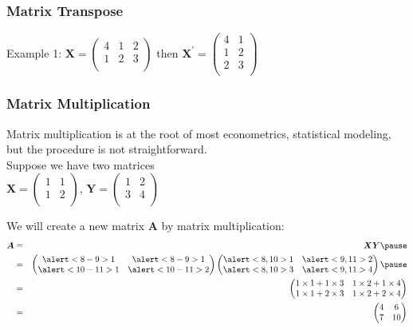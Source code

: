 \documentclass{beamer}
\numberwithin{equation}{section}
\begin{document}
\begin{frame}
\frametitle{Matrix Transpose}

Example 1:  $\boldsymbol{X} = \begin{pmatrix} 4 & 1 & 2 \\1 & 2  & 3 \\ \end{pmatrix} $ then 
$\boldsymbol{X}^{'} = \begin{pmatrix} 4 & 1 \\ 1 & 2 \\ 2 & 3 \\ \end{pmatrix} $ \\
\end{frame}



\begin{frame}
\frametitle{Matrix Multiplication}

Matrix multiplication is at the root of most econometrics, statistical modeling, but the procedure is not straightforward.\\

Suppose we have two matrices \pause  \\
$\boldsymbol{X} = \begin{pmatrix} 1 & 1 \\ 1& 2 \\ \end{pmatrix} $, $\boldsymbol{Y} = \begin{pmatrix} 1 & 2 \\ 3 & 4 \\ \end{pmatrix} $ \pause 

We will create a new matrix $\boldsymbol{A}$ by matrix multiplication: \pause 
\begin{eqnarray} 
\boldsymbol{A} & = & \boldsymbol{X} \boldsymbol{Y} \nonumber  \pause \\
				& = & \begin{pmatrix} \alert<8-9>{1} & \alert<8-9>{1} \\ \alert<10-11>{1}& \alert<10-11>{2}\\ \end{pmatrix} \begin{pmatrix} \alert<8,10>{1} & \alert<9,11>{2} \\ \alert<8,10>{3} & \alert<9,11>{4} \\ \end{pmatrix}
\nonumber  \pause \\
     					& = & \begin{pmatrix} 
							1 \times 1 + 1 \times 3  & 1 \times 2 + 1 \times 4  \\
							1 \times 1  + 2\times 3  & 1 \times 2 + 2 \times 4   \\
							\end{pmatrix} \nonumber \\
					& = & \begin{pmatrix} 
							4 & 6 \\
							7& 10 \\
							\end{pmatrix}		
							\nonumber 
\end{eqnarray}							


\end{frame}
\end{document}
